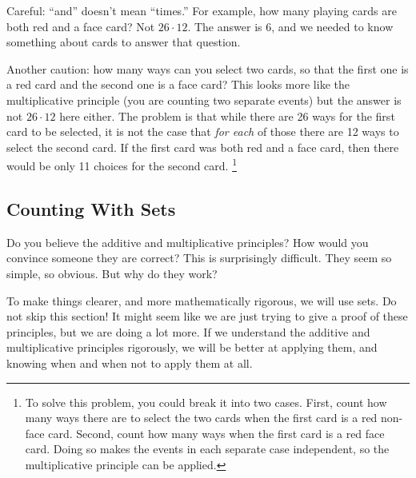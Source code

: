 \documentclass[10pt,]{book}
\theoremstyle{plain}
\theoremstyle{definition}
\theoremstyle{definition}
\theoremstyle{definition}
\numberwithin{equation}{section}
\begin{document}
    Careful: ``and'' doesn't mean ``times.'' For example, how many playing cards are both red and a face card? Not \(26 \cdot 12\). The answer is 6, and we needed to know something about cards to answer that question.
\par

    Another caution: how many ways can you select two cards, so that the first one is a red card and the second one is a face card? This looks more like the multiplicative principle (you are counting two separate events) but the answer is not \(26 \cdot 12\) here either. The problem is that while there are 26 ways for the first card to be selected, it is not the case that \emph{for each} of those there are 12 ways to select the second card. If the first card was both red and a face card, then there would be only 11 choices for the second card.
    \footnote{To solve this problem, you could break it into two cases. First, count how many ways there are to select the two cards when the first card is a red non-face card. Second, count how many ways when the first card is a red face card. Doing so makes the events in each separate case independent, so the multiplicative principle can be applied.\label{fn-1}}
\typeout{************************************************}
\typeout{************************************************}
\subsection[Counting With Sets]{Counting With Sets}\label{subsec_countingWithSets}

      Do you believe the additive and multiplicative principles? How would you convince someone they are correct? This is surprisingly difficult. They seem so simple, so obvious. But why do they work?
\par

      To make things clearer, and more mathematically rigorous, we will use sets. Do not skip this section! It might seem like we are just trying to give a proof of these principles, but we are doing a lot more. If we understand the additive and multiplicative principles rigorously, we will be better at applying them, and knowing when and when not to apply them at all.
\par
\end{document}
